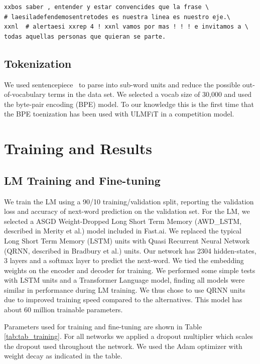 \documentclass[runningheads]{llncs}
\begin{document}
\begin{verbatim} 
xxbos saber , entender y estar convencides que la frase \
# laesiladefendemosentretodes es nuestra linea es nuestro eje.\
xxnl  # alertaesi xxrep 4 ! xxnl vamos por mas ! ! ! e invitamos a \
todas aquellas personas que quieran se parte.
\end{verbatim}

\subsection{Tokenization}
We used sentencepiece~\cite{SentencePiece:DBLP:journals/corr/abs-1808-06226} to parse into sub-word units and reduce the possible out-of-vocabulary terms in the data set.  We selected a vocab size of 30,000 and used the byte-pair encoding (BPE) model. To our knowledge this is the first time that the BPE toenization has been used with ULMFiT in a competition model.

\section{Training and Results}
\label{sec:4}
\subsection{LM Training and Fine-tuning}
We train the LM using a 90/10 training/validation split, reporting the validation loss and accuracy of next-word prediction on the validation set. For the LM, we selected a ASGD Weight-Dropped Long Short Term Memory (AWD\_LSTM, described in Merity et al.\cite{Merity:DBLP:journals/corr/abs-1708-02182}) model included in Fast.ai. We replaced the typical Long Short Term Memory (LSTM) units with Quasi Recurrent Neural Network (QRNN, described in Bradbury et al.\cite{Bradbury:DBLP:journals/corr/BradburyMXS16}) units.  Our network has 2304 hidden-states, 3 layers and a softmax layer to predict the next-word.  We tied the embedding weights\cite{WeightTie:DBLP:journals/corr/PressW16} on the encoder and decoder for training.  We performed some simple tests with LSTM units and a Transformer Language model, finding all models were similar in performance during LM training. We thus chose to use QRNN units due to improved training speed compared to the alternatives. This model has about 60 million trainable parameters.  

Parameters used for training and fine-tuning are shown in Table \ref{tab:tab_training}.
For all networks we applied a dropout multiplier which scales the dropout used throughout the network.  We used the Adam optimizer with weight decay as indicated in the table.  
\end{document}
